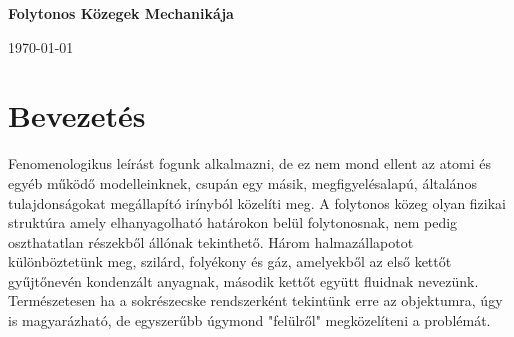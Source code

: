\documentclass{article}
\begin{document}
\begin{titlepage}
\begin{center}
        \vspace*{1cm}
            
        \Large
        \textbf{Folytonos Közegek Mechanikája}

            
        \vspace{1.5cm}
            
        \vfill
            
        
        \today
            
    \end{center}

\end{titlepage}
\tableofcontents
\newpage
\section{Bevezetés}
Fenomenologikus leírást fogunk alkalmazni, de ez nem mond ellent az atomi és egyéb működő modelleinknek, csupán egy másik, megfigyelésalapú, általános tulajdonságokat megállapító irínyból közelíti meg. 
A folytonos közeg olyan fizikai struktúra amely elhanyagolható határokon belül folytonosnak, nem pedig oszthatatlan részekből állónak tekinthető. Három halmazállapotot különböztetünk meg, szilárd, folyékony és gáz, amelyekből az első kettőt gyűjtőnevén kondenzált anyagnak, második kettőt együtt fluidnak nevezünk. Természetesen ha a sokrészecske rendszerként tekintünk erre az objektumra, úgy is magyarázható, de egyszerűbb úgymond "felülről" megközelíteni a problémát. 
\end{document}
